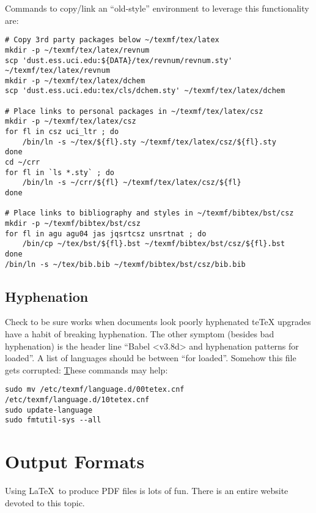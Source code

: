 \documentclass[12pt]{article}
\begin{document}
Commands to copy/link an ``old-style'' environment to leverage this
functionality are: 
\begin{verbatim}
# Copy 3rd party packages below ~/texmf/tex/latex
mkdir -p ~/texmf/tex/latex/revnum
scp 'dust.ess.uci.edu:${DATA}/tex/revnum/revnum.sty' ~/texmf/tex/latex/revnum
mkdir -p ~/texmf/tex/latex/dchem
scp 'dust.ess.uci.edu:tex/cls/dchem.sty' ~/texmf/tex/latex/dchem

# Place links to personal packages in ~/texmf/tex/latex/csz
mkdir -p ~/texmf/tex/latex/csz
for fl in csz uci_ltr ; do
    /bin/ln -s ~/tex/${fl}.sty ~/texmf/tex/latex/csz/${fl}.sty
done
cd ~/crr
for fl in `ls *.sty` ; do
    /bin/ln -s ~/crr/${fl} ~/texmf/tex/latex/csz/${fl}
done

# Place links to bibliography and styles in ~/texmf/bibtex/bst/csz
mkdir -p ~/texmf/bibtex/bst/csz
for fl in agu agu04 jas jqsrtcsz unsrtnat ; do
    /bin/cp ~/tex/bst/${fl}.bst ~/texmf/bibtex/bst/csz/${fl}.bst
done
/bin/ln -s ~/tex/bib.bib ~/texmf/bibtex/bst/csz/bib.bib
\end{verbatim}

\subsection[Hyphenation]{Hyphenation}\label{sxn:hyp}
Check to be sure  works when documents look poorly hyphenated 
 teTeX upgrades have a habit of breaking hyphenation.
The other symptom (besides bad hyphenation) is the header line
``Babel <v3.8d> and hyphenation patterns for loaded''.
A list of languages should be between ``for loaded''.
Somehow this file gets corrupted:
\href{http://www.mail-archive.com/desktop-bugs@lists.ubuntu.com/msg29134.html}
These commands may help:
\begin{verbatim}
sudo mv /etc/texmf/language.d/00tetex.cnf /etc/texmf/language.d/10tetex.cnf
sudo update-language
sudo fmtutil-sys --all
\end{verbatim}

\section[Output Formats]{Output Formats}\label{sxn:out}
Using \LaTeX\ to produce PDF files is lots of fun.
There is an entire  website devoted to this topic.
\end{document}
